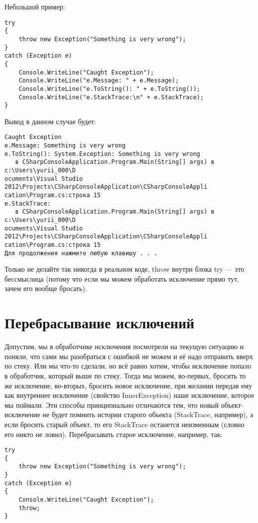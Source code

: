 \documentclass[a5paper]{article}
\begin{document}
Небольшой пример:

\begin{verbatim}
try
{
    throw new Exception("Something is very wrong");
}
catch (Exception e)
{
    Console.WriteLine("Caught Exception");
    Console.WriteLine("e.Message: " + e.Message);
    Console.WriteLine("e.ToString(): " + e.ToString());
    Console.WriteLine("e.StackTrace:\n" + e.StackTrace);
}
\end{verbatim}

Вывод в данном случае будет:

\begin{verbatim}
Caught Exception
e.Message: Something is very wrong
e.ToString(): System.Exception: Something is very wrong
   в CSharpConsoleApplication.Program.Main(String[] args) в c:\Users\yurii_000\D
ocuments\Visual Studio 2012\Projects\CSharpConsoleApplication\CSharpConsoleAppli
cation\Program.cs:строка 15
e.StackTrace:
   в CSharpConsoleApplication.Program.Main(String[] args) в c:\Users\yurii_000\D
ocuments\Visual Studio 2012\Projects\CSharpConsoleApplication\CSharpConsoleAppli
cation\Program.cs:строка 15
Для продолжения нажмите любую клавишу . . .
\end{verbatim}

Только не делайте так никогда в реальном коде, throw внутри блока try --- это бессмыслица (потому что если мы можем обработать исключение прямо тут, зачем его вообще бросать).

\section{Перебрасывание исключений}

Допустим, мы в обработчике исключения посмотрели на текущую ситуацию и поняли, что сами мы разобраться с ошибкой не можем и её надо отправить вверх по стеку. Или мы что-то сделали, но всё равно хотим, чтобы исключение попало в обработчик, который выше по стеку. Тогда мы можем, во-первых, бросить то же исключение, во-вторых, бросить новое исключение, при желании передав ему как внутреннее исключение (свойство InnerException) наше исключение, которое мы поймали. Эти способы принципиально отличаются тем, что новый объект-исключение не будет помнить истории старого объекта (StackTrace, например), а если бросить старый объект, то его StackTrace останется неизменным (словно его никто не ловил). Перебрасывать старое исключение, например, так:

\begin{verbatim}
try
{
    throw new Exception("Something is very wrong");
}
catch (Exception e)
{
    Console.WriteLine("Caught Exception");
    throw;
}
\end{verbatim}
\end{document}
